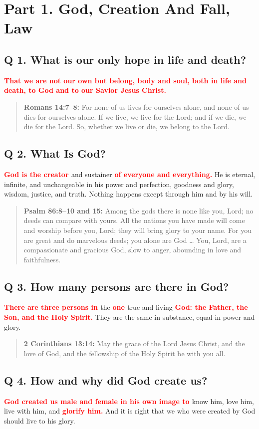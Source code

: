 \documentclass[titlepage]{memoir}
\newcommand\Children[1]{\textbf{\textcolor{red}{#1}}}
\newcommand\Quote[2]{\begin{quote}{\small\textbf{#1:}{ #2}}\end{quote}}
\begin{document}
\section[Part 1. God, Creation And Fall, Law][God, Creation And Fall, Law]{Part 1. God, Creation And Fall, Law}

\subsection{Q  1. What is our only hope in life and death?}
\Children{That we are not our own but belong, body and soul, both in life and death, to God and to our Savior Jesus Christ.}

\Quote{Romans 14:7--8}{For none of us lives for ourselves alone, and none of us dies for ourselves alone. If we live, we live for the Lord; and if we die, we die for the Lord. So, whether we live or die, we belong to the Lord.}


\subsection{Q  2. What Is God?}
\Children{God is the creator }and sustainer \Children{of everyone and everything.} He is eternal, infinite, and unchangeable in his power and perfection, goodness and glory, wisdom, justice, and truth. Nothing happens except through him and by his will.

\Quote{Psalm 86:8--10 and 15\index[psa]{86:15}}{Among the gods there is none like you, Lord; no deeds can compare with yours. All the nations you have made will come and worship before you, Lord; they will bring glory to your name. For you are great and do marvelous deeds; you alone are God {\dots} You, Lord, are a compassionate and gracious God, slow to anger, abounding in love and faithfulness.}


\subsection{Q  3. How many persons are there in God?}
\Children{There are three persons in }the \Children{one }true and living \Children{God: the Father, the Son, and the Holy Spirit.} They are the same in substance, equal in power and glory.

\Quote{2 Corinthians 13:14}{May the grace of the Lord Jesus Christ, and the love of God, and the fellowship of the Holy Spirit be with you all.}


\subsection{Q  4. How and why did God create us?}
\Children{God created us male and female in his own image to }know him, love him, live with him, and \Children{glorify him.} And it is right that we who were created by God should live to his glory.
\end{document}
